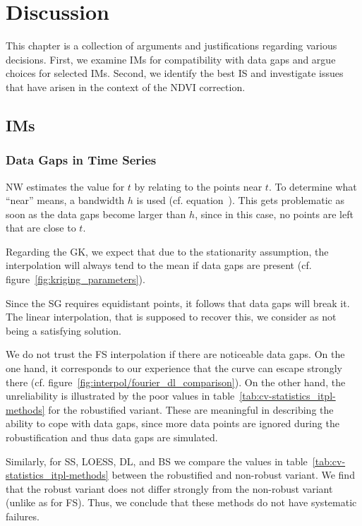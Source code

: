 \chapter{Discussion}\label{sec:discussion}
    This chapter is a collection of arguments and justifications regarding various decisions. First, we examine IMs for compatibility with data gaps and argue choices for selected IMs. Second, we identify the best IS and investigate issues that have arisen in the context of the NDVI correction.


\section{{{IM}}s}{ \label{sec:discussion_itpl}
    \subsection{Data Gaps in Time Series}\label{sec:discussion_itpl_data_gaps}{
        NW estimates the value for $t$ by relating to the points near $t$. To determine what ``near'' means, a bandwidth $h$ is used (cf. equation~). This gets problematic as soon as the data gaps become larger than $h$, since in this case, no points are left that are close to $t$. 

        Regarding the GK, we expect that due to the stationarity assumption, the interpolation will always tend to the mean if data gaps are present (cf. figure~\ref{fig:kriging_parameters}). 

        Since the SG requires equidistant points, it follows that data gaps will break it. The linear interpolation, that is supposed to recover this, we consider as not being a satisfying solution.

        We do not trust the FS interpolation if there are noticeable data gaps. On the one hand, it corresponds to our experience that the curve can escape strongly there (cf. figure~\ref{fig:interpol/fourier_dl_comparison}). On the other hand, the unreliability is illustrated by the poor values in table~\ref{tab:cv-statistics_itpl-methods} for the robustified variant. These are meaningful in describing the ability to cope with data gaps, since more data points are ignored during the robustification and thus data gaps are simulated. 

        Similarly, for SS, LOESS, DL, and BS we compare the values in table~\ref{tab:cv-statistics_itpl-methods} between the robustified and non-robust variant. We find that the robust variant does not differ strongly from the non-robust variant (unlike as for FS). Thus, we conclude that these methods do not have systematic failures.

}}
